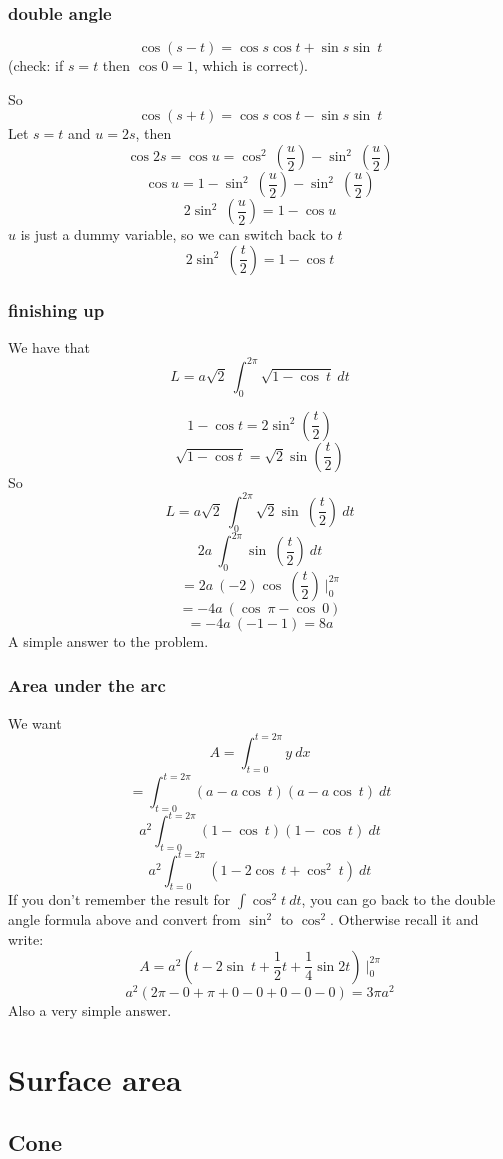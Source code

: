 \documentclass[11pt, oneside]{report}   	%
\begin{document}
\subsection*{double angle}

\[ \cos (s-t) = \cos s \cos t + \sin s \sin \ t \]
(check:  if $s=t$ then $\cos 0 = 1$, which is correct).

So
\[ \cos (s+t) = \cos s \cos t - \sin s \sin \ t \]
Let $s = t$ and $u = 2s$, then
\[ \cos 2s = \cos u = \cos^2 \ (\frac{u}{2}) - \sin^2 \ (\frac{u}{2}) \]
\[ \cos u = 1 - \sin^2 \ (\frac{u}{2}) - \sin^2 \ (\frac{u}{2}) \]
\[ 2 \sin^2 \ (\frac{u}{2}) = 1 - \cos u \]
$u$ is just a dummy variable, so we can switch back to $t$
\[ 2 \sin^2 \ (\frac{t}{2}) = 1 - \cos t \]

\subsection*{finishing up}
We have that 
\[ L = a \sqrt{2} \ \int_0^{2\pi} \sqrt{1 - \cos \ t} \ dt\]

\[ 1 - \cos t = 2 \sin^2(\frac{t}{2}) \]
\[ \sqrt{1 - \cos t} = \sqrt{2} \sin(\frac{t}{2}) \]
So
\[ L = a \sqrt{2} \ \int_0^{2\pi} \sqrt{2} \sin \ (\frac{t}{2}) \ dt\]
\[  2a  \ \int_0^{2\pi} \sin \ (\frac{t}{2}) \ dt\]
\[ = 2a \ (-2) \cos \ (\frac{t}{2})\ \bigg |_0^{2\pi} \]
\[ = -4a \ (\cos \ \pi - \cos \ 0) \]
\[ = -4a \ (-1 - 1) = 8a\]
A simple answer to the problem.

\subsection*{Area under the arc}
We want
\[ A = \int_{t=0}^{t=2\pi} y \ dx \]
\[ = \int_{t=0}^{t=2\pi} (a - a \cos\ t) (a - a \cos\ t) \ dt \]
\[ a^2\int_{t=0}^{t=2\pi} (1 - \cos\ t) (1 - \cos\ t) \ dt \]
\[ a^2\int_{t=0}^{t=2\pi} (1 - 2 \cos\ t + \cos^2\ t) \ dt \]
If you don't remember the result for $\int \cos^2 t \ dt$, you can go back to the double angle formula above and convert from $\sin^2$ to $\cos^2$.  Otherwise recall it and write:
\[ A = a^2 ( t - 2 \sin \ t + \frac{1}{2}t + \frac{1}{4} \sin 2t ) \ \bigg|_0^{2\pi} \]
\[ a^2 ( 2\pi - 0 + \pi + 0 - 0 + 0 - 0 - 0    ) = 3\pi a^2 \]
Also a very simple answer.

\chapter{Surface area}
\section*{Cone}
\end{document}

